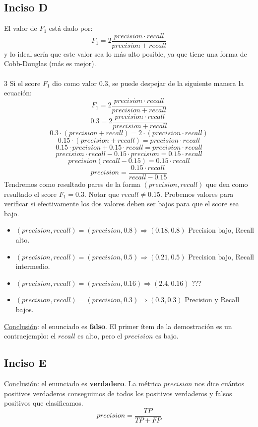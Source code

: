 \documentclass{article}
\begin{document}
        \subsection*{Inciso D}
            El valor de $F_{1}$ está dado por:
            \[ F_{1} = 2 \frac{precision \cdot recall}{precision + recall} \]
            y lo ideal sería que este valor sea lo más alto posible, ya que tiene una forma de Cobb-Douglas (más es mejor). \\
            \\3
            Si el score $F_{1}$ dio como valor $0.3$, se puede despejar de la siguiente manera la ecuación:
            \[ F_{1} = 2 \frac{precision \cdot recall}{precision + recall} \]
            \[ 0.3 = 2 \frac{precision \cdot recall}{precision + recall} \]
            \[ 0.3 \cdot (precision+recall) = 2 \cdot (precision \cdot recall) \]
            \[ 0.15 \cdot (precision+recall) = precision \cdot recall \]
            \[ 0.15 \cdot precision + 0.15 \cdot recall = precision \cdot recall \]
            \[ precision \cdot recall - 0.15 \cdot precision = 0.15 \cdot recall \]
            \[ precision(recall - 0.15) = 0.15 \cdot recall \]
            \[ precision = \frac{0.15 \cdot recall}{recall - 0.15} \]
            Tendremos como resultado pares de la forma $(precision, recall)$ que den como resultado el score $F_{1} = 0.3$. Notar que $recall \neq 0.15$. Probemos valores para verificar si efectivamente los dos valores deben ser bajos para que el score sea bajo.
            \begin{itemize}
                \item $(precision, recall) = (precision, 0.8) \Rightarrow (0.18, 0.8)$ Precision bajo, Recall alto.
                \item $(precision, recall) = (precision, 0.5) \Rightarrow (0.21, 0.5)$ Precision bajo, Recall intermedio.
                \item $(precision, recall) = (precision, 0.16) \Rightarrow (2.4, 0.16)$ ???
                \item $(precision, recall) = (precision, 0.3) \Rightarrow (0.3, 0.3)$ Precision y Recall bajos.
            \end{itemize}
            \underline{Conclusión}: el enunciado es \textbf{falso}. El primer ítem de la demostración es un contraejemplo: el $recall$ es alto, pero el $precision$ es bajo.
        \subsection*{Inciso E}
            \underline{Conclusión}: el enunciado es \textbf{verdadero}. La métrica $precision$ nos dice cuántos positivos verdaderos conseguimos de todos los positivos verdaderos y falsos positivos que clasificamos.
            \[ precision = \frac{TP}{TP+FP} \]
\end{document}
